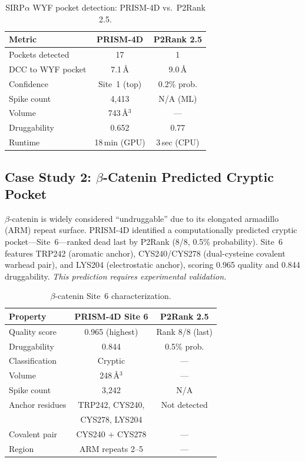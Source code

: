 \documentclass{sn-jnl}
\begin{document}
\begin{table}[h]
\centering
\caption{SIRP$\alpha$ WYF pocket detection: PRISM-4D vs.\ P2Rank 2.5.}
\label{tab:sirpa}
\begin{tabular}{lcc}
\toprule
\textbf{Metric} & \textbf{PRISM-4D} & \textbf{P2Rank 2.5} \\
\midrule
Pockets detected   & 17              & 1 \\
DCC to WYF pocket  & 7.1\,\AA{}     & 9.0\,\AA{} \\
Confidence         & Site~1 (top)    & 0.2\% prob. \\
Spike count        & 4{,}413        & N/A (ML) \\
Volume             & 743\,\AA$^3$   & --- \\
Druggability       & 0.652           & 0.77 \\
Runtime            & 18\,min (GPU)   & 3\,sec (CPU) \\
\bottomrule
\end{tabular}
\end{table}

\subsection{Case Study 2: \texorpdfstring{$\beta$}{Beta}-Catenin Predicted Cryptic Pocket}

$\beta$-catenin is widely considered ``undruggable'' due to its elongated armadillo (ARM)
repeat surface. PRISM-4D identified a computationally predicted cryptic pocket---Site~6---ranked
dead last by P2Rank (8/8, 0.5\% probability). Site~6 features TRP242 (aromatic anchor),
CYS240/CYS278 (dual-cysteine covalent warhead pair), and LYS204 (electrostatic anchor),
scoring 0.965 quality and 0.844 druggability. \textit{This prediction requires experimental
validation.}

\begin{table}[h]
\centering
\caption{$\beta$-catenin Site~6 characterization.}
\label{tab:bcatenin}
\begin{tabular}{lcc}
\toprule
\textbf{Property} & \textbf{PRISM-4D Site 6} & \textbf{P2Rank 2.5} \\
\midrule
Quality score    & 0.965 (highest)          & Rank 8/8 (last) \\
Druggability     & 0.844                     & 0.5\% prob. \\
Classification   & Cryptic                   & --- \\
Volume           & 248\,\AA$^3$             & --- \\
Spike count      & 3{,}242                  & N/A \\
Anchor residues  & TRP242, CYS240,          & Not detected \\
                 & CYS278, LYS204           & \\
Covalent pair    & CYS240 + CYS278          & --- \\
Region           & ARM repeats 2--5         & --- \\
\bottomrule
\end{tabular}
\end{table}
\end{document}
